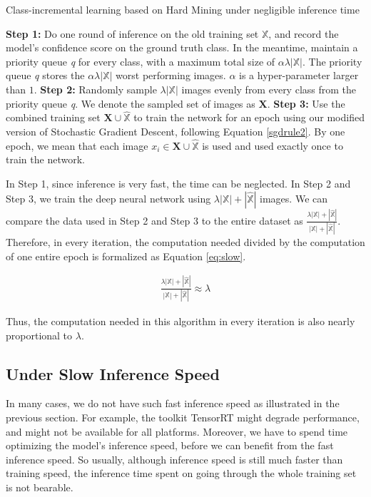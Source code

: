 \begin{algorithm}
\caption{Class-incremental learning based on Hard Mining under negligible inference time}
\label{algo:fast}
	\begin{algorithmic}
		\State \textbf{Step 1:} Do one round of inference on the old training set $\mathbb{X}$, and record the model's confidence score on the ground truth class. In the meantime, maintain a priority queue \textit{q} for every class, with a maximum total size of $\alpha \lambda |\mathbb{X}|$. The priority queue \textit{q} stores the $\alpha \lambda |\mathbb{X}|$ worst performing images. $\alpha$ is a hyper-parameter larger than $1$.
		\State \textbf{Step 2:} Randomly sample $\lambda|\mathbb{X}|$ images evenly from every class from the priority queue \textit{q}. We denote the sampled set of images as $\mathbf{X}$. 
		\State \textbf{Step 3:} Use the combined training set $\mathbf{X} \cup \hat{\mathbb{X}}$ to train the network for an epoch using our modified version of Stochastic Gradient Descent, following Equation \ref{sgdrule2}. By one epoch, we mean that each image $x_i \in \mathbf{X} \cup \hat{\mathbb{X}}$ is used and used exactly once to train the network.
		\EndFor
	\end{algorithmic}
\end{algorithm}

In Step 1, since inference is very fast, the time can be neglected. In Step 2 and Step 3, we train the deep neural network using $\lambda|\mathbb{X}| + |\hat{\mathbb{X}}|$ images. We can compare the data used in Step 2 and Step 3 to the entire dataset as
$\frac{\lambda|\mathbb{X}| + |\hat{\mathbb{X}}|}{|\mathbb{X}| + |\hat{\mathbb{X}}|}$. Therefore, in every iteration, the computation needed divided by the computation of one entire epoch is formalized as Equation \ref{eq:slow}.

\begin{align}
\frac{\lambda|\mathbb{X}| + |\hat{\mathbb{X}}|}{|\mathbb{X}| + |\hat{\mathbb{X}}|} \approx \lambda
\label{eq:slow}
\end{align}

Thus, the computation needed in this algorithm in every iteration is also nearly proportional to $\lambda$.

\subsection{Under Slow Inference Speed}

In many cases, we do not have such fast inference speed as illustrated in the previous section. For example, the toolkit TensorRT might degrade performance, and might not be available for all platforms. Moreover, we have to spend time optimizing the model's inference speed, before we can benefit from the fast inference speed. So usually, although inference speed is still much faster than training speed, the inference time spent on going through the whole training set is not bearable.

